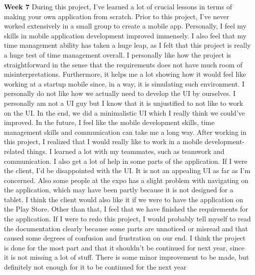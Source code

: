 \documentclass[journal,compsoc, 10pt, draftclsnofoot, onecolumn]{IEEEtran}
\begin{document}
\textbf{Week 7}\newline
During this project, I've learned a lot of crucial lessons in terms of making your own
application from scratch. Prior to this project, I've never worked extensively in a small group 
to create a mobile app. Personally, I feel my skills in mobile application development improved 
immensely. I also feel that my time management ability has taken a huge leap, as I felt that
this project is really a huge test of time management overall. I personally like how the
project is straightforward in the sense that the requirements does not have much room of
misinterpretations. Furthermore, it helps me a lot showing how it would feel like working at a
startup mobile since, in a way, it is simulating such environment. I personally do not like how 
we actually need to develop the UI by ourselves. I personally am not a UI guy but I know that
it is unjustified to not like to work on the UI. In the end, we did a minimalistic UI which I
really think we could've improved. In the future, I feel like the mobile development skills,
time management skills and communication can take me a long way. After working in this project, 
I realized that I would really like to work in a mobile development-related things. I learned a 
lot with my teammates, such as teamwork and communication. I also get a lot of help in some
parts of the application. If I were the client, I'd be disappointed with the UI. It is not an
appealing UI as far as I'm concerned. Also some people at the expo has a slight problem with
navigating on the application, which may have been partly because it is not designed for a
tablet. I think the client would also like it if we were to have the application on the Play
Store. Other than that, I feel that we have finished the requirements for the application. If I 
were to redo this project, I would probably tell myself to read the documentation clearly
because some parts are unnoticed or misread and that caused some degrees of confusion and
frustration on our end. I think the project is done for the most part and that it shouldn't be
continued for next year, since it is not missing a lot of stuff. There is some minor
improvement to be made, but definitely not enough for it to be continued for the next year

\newpage
\end{document}
